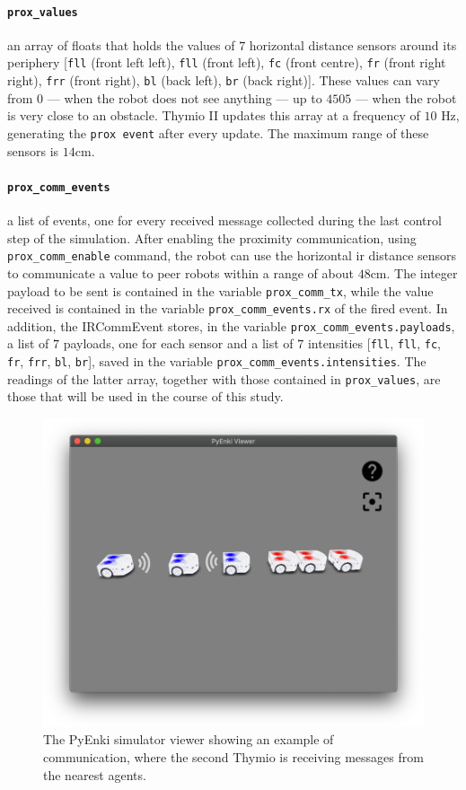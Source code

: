 \paragraph*{\texttt{prox\_values}}
 an array of floats that holds the values of $7$ horizontal distance sensors around 
 its periphery [\texttt{fll} (front left left), \texttt{fll} (front left), \texttt{fc} (front 
 centre), \texttt{fr} (front right right), \texttt{frr} (front right), \texttt{bl} (back left), 
 \texttt{br} (back right)]. 
These values can vary from $0$ — when the robot does not see anything — up to 
$4505$ — when the robot is very close to an obstacle. 
Thymio II updates this array at a frequency of $10$ \gls{Hz}, generating the 
\texttt{prox event} after every update. 
The maximum range of these sensors is $14$\gls{cm}.

\paragraph*{\texttt{prox\_comm\_events}}

a list of events, one for every received message collected during the last control 
step of the simulation. 
After enabling the proximity communication, using \texttt{prox\_comm\_enable} 
command, the robot can use the horizontal \gls{ir} distance sensors to 
communicate a value to peer robots within a range of about $48$\gls{cm}. 
The integer payload to be sent is contained in the variable 
\texttt{prox\_comm\_tx}, while the value received is contained in the variable 
\texttt{prox\_comm\_events.rx} of the fired event.
In addition, the IRCommEvent stores, in the variable 
\texttt{prox\_comm\_events.payloads}, a list of $7$ payloads, one for each sensor 
and a list of  $7$ intensities  [\texttt{fll}, \texttt{fll}, \texttt{fc}, \texttt{fr}, 
\texttt{frr}, \texttt{bl}, \texttt{br}], saved in the variable 
\texttt{prox\_comm\_events.intensities}.
The readings of the latter array, together with those contained in 
\texttt{prox\_values}, are those that will be used in the course of this study.

\begin{figure}[!htb]
	\centering
	\includegraphics[width=.6\textwidth]{contents/images/thymio-comm}
	\caption[Example of communication with the PyEnki simulator]{The PyEnki 
	simulator viewer showing an example of communication, 
	where the second Thymio is receiving messages from the nearest agents.}
	\label{fig:thymio comm}
\end{figure}

